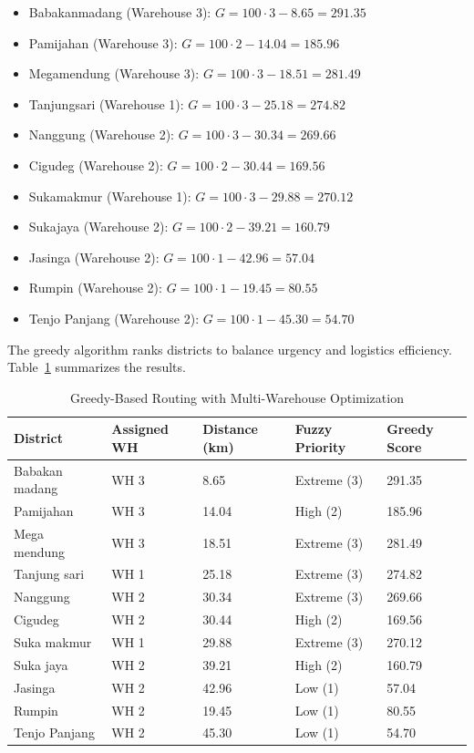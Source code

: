 \documentclass[journal,final,a4paper,twoside,11pt]{IEEEtran}
\begin{document}
\begin{itemize}
    \item Babakanmadang (Warehouse 3): \( G = 100 \cdot 3 - 8.65 = 291.35 \)
    \item Pamijahan (Warehouse 3): \( G = 100 \cdot 2 - 14.04 = 185.96 \)
    \item Megamendung (Warehouse 3): \( G = 100 \cdot 3 - 18.51 = 281.49 \)
    \item Tanjungsari (Warehouse 1): \( G = 100 \cdot 3 - 25.18 = 274.82 \)
    \item Nanggung (Warehouse 2): \( G = 100 \cdot 3 - 30.34 = 269.66 \)
    \item Cigudeg (Warehouse 2): \( G = 100 \cdot 2 - 30.44 = 169.56 \)
    \item Sukamakmur (Warehouse 1): \( G = 100 \cdot 3 - 29.88 = 270.12 \)
    \item Sukajaya (Warehouse 2): \( G = 100 \cdot 2 - 39.21 = 160.79 \)
    \item Jasinga (Warehouse 2): \( G = 100 \cdot 1 - 42.96 = 57.04 \)
    \item Rumpin (Warehouse 2): \( G = 100 \cdot 1 - 19.45 = 80.55 \)
    \item Tenjo Panjang (Warehouse 2): \( G = 100 \cdot 1 - 45.30 = 54.70 \)
\end{itemize}


The greedy algorithm ranks districts to balance urgency and logistics efficiency. Table~\ref{tab:greedy_multiwh} summarizes the results.

\begin{table}[H]
\caption{Greedy-Based Routing with Multi-Warehouse Optimization}
\begin{center}
\begin{tabular}{|p{1.5cm}|p{1cm}|p{1cm}|p{1cm}|p{1cm}|}
\hline
\textbf{District} & \textbf{Assigned WH} & \textbf{Distance (km)} & \textbf{Fuzzy Priority} & \textbf{Greedy Score} \\
\hline
Babakan madang & WH 3 & 8.65 & Extreme (3) & 291.35 \\
\hline Pamijahan & WH 3 & 14.04 & High (2) & 185.96 \\
\hline Mega mendung & WH 3 & 18.51 & Extreme (3) & 281.49 \\
\hline  Tanjung sari & WH 1 & 25.18 & Extreme (3) & 274.82 \\
\hline Nanggung & WH 2 & 30.34 & Extreme (3) & 269.66 \\
\hline Cigudeg & WH 2 & 30.44 & High (2) & 169.56 \\
\hline Suka makmur & WH 1 & 29.88 & Extreme (3) & 270.12 \\
\hline Suka jaya & WH 2 & 39.21 & High (2) & 160.79 \\
\hline Jasinga & WH 2 & 42.96 & Low (1) & 57.04 \\
\hline Rumpin & WH 2 & 19.45 & Low (1) & 80.55 \\
\hline Tenjo Panjang & WH 2 & 45.30 & Low (1) & 54.70 \\
\hline
\end{tabular}
\label{tab:greedy_multiwh}
\end{center}
\end{table}
\end{document}
